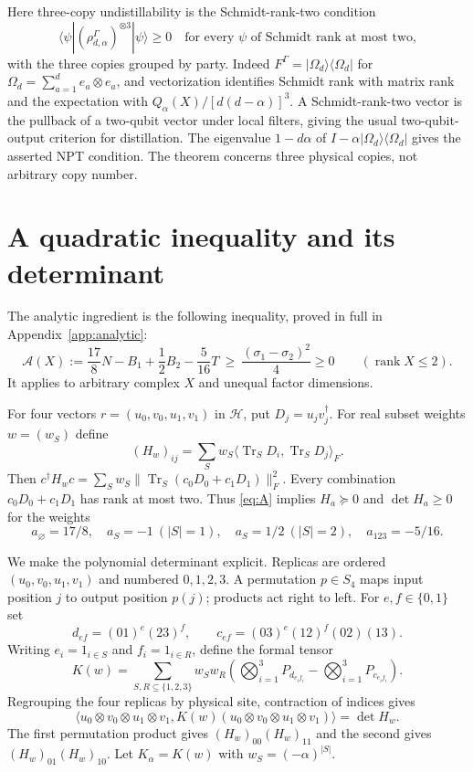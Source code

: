 \documentclass[10pt]{article}
\DeclareMathOperator{\Tr}{Tr}
\DeclareMathOperator{\rank}{rank}
\newcommand{\HH}{\mathcal H}
\newcommand{\Aux}{\mathcal A}
\begin{document}
Here three-copy undistillability is the Schmidt-rank-two condition
\[
 \langle\psi|(\rho_{d,\alpha}^{\Gamma})^{\otimes3}|\psi\rangle\ge0
 \quad\text{for every $\psi$ of Schmidt rank at most two,}
\]
with the three copies grouped by party. Indeed
$F^\Gamma=|\Omega_d\rangle\langle\Omega_d|$ for
$\Omega_d=\sum_{a=1}^d e_a\otimes e_a$, and vectorization identifies
Schmidt rank with matrix rank and the expectation with
$Q_\alpha(X)/[d(d-\alpha)]^3$. A Schmidt-rank-two vector is the pullback
of a two-qubit vector under local filters, giving the usual two-qubit-output
criterion for distillation. The eigenvalue $1-d\alpha$ of
$I-\alpha|\Omega_d\rangle\langle\Omega_d|$ gives the asserted NPT condition.
The theorem concerns three physical copies, not arbitrary copy number.

\section{A quadratic inequality and its determinant}
The analytic ingredient is the following inequality, proved in full in
Appendix~\ref{app:analytic}:
\begin{equation}\label{eq:A}
 \Aux(X):=\frac{17}{8}N-B_1+\frac12B_2-\frac5{16}T
 \ \ge\ \frac{(\sigma_1-\sigma_2)^2}{4}\ge0
 \qquad(\rank X\le2).
\end{equation}
It applies to arbitrary complex $X$ and unequal factor dimensions.

For four vectors $r=(u_0,v_0,u_1,v_1)$ in $\HH$, put
$D_j=u_jv_j^\dagger$. For real subset weights $w=(w_S)$ define
\[
 (H_w)_{ij}=\sum_S w_S\langle\Tr_S D_i,\Tr_S D_j\rangle_F.
\]
Then $c^\dagger H_wc=\sum_Sw_S\|\Tr_S(c_0D_0+c_1D_1)\|_F^2$.
Every combination $c_0D_0+c_1D_1$ has rank at most two. Thus \eqref{eq:A} implies
$H_a\succeq0$ and $\det H_a\ge0$ for the weights
\begin{equation}\label{eq:aweights}
 a_\varnothing=17/8,\quad a_S=-1\ (|S|=1),\quad
 a_S=1/2\ (|S|=2),\quad a_{123}=-5/16.
\end{equation}

We make the polynomial determinant explicit. Replicas are ordered
$(u_0,v_0,u_1,v_1)$ and numbered $0,1,2,3$. A permutation $p\in S_4$
maps input position $j$ to output position $p(j)$; products act right to left.
For $e,f\in\{0,1\}$ set
\[
 d_{ef}=(01)^e(23)^f,\qquad
 c_{ef}=(03)^e(12)^f(02)(13).
\]
Writing $e_i=1_{i\in S}$ and $f_i=1_{i\in R}$, define the formal tensor
\begin{equation}\label{eq:Kw}
 K(w)=\sum_{S,R\subseteq\{1,2,3\}}w_Sw_R
 \left(\bigotimes_{i=1}^3 P_{d_{e_if_i}}
       -\bigotimes_{i=1}^3 P_{c_{e_if_i}}\right).
\end{equation}
Regrouping the four replicas by physical site, contraction of indices gives
\begin{equation}\label{eq:det}
 \langle u_0\otimes v_0\otimes u_1\otimes v_1,
 K(w)(u_0\otimes v_0\otimes u_1\otimes v_1)\rangle=\det H_w.
\end{equation}
The first permutation product gives $(H_w)_{00}(H_w)_{11}$ and the
second gives $(H_w)_{01}(H_w)_{10}$. Let $K_\alpha=K(w)$ with
$w_S=(-\alpha)^{|S|}$.
\end{document}
